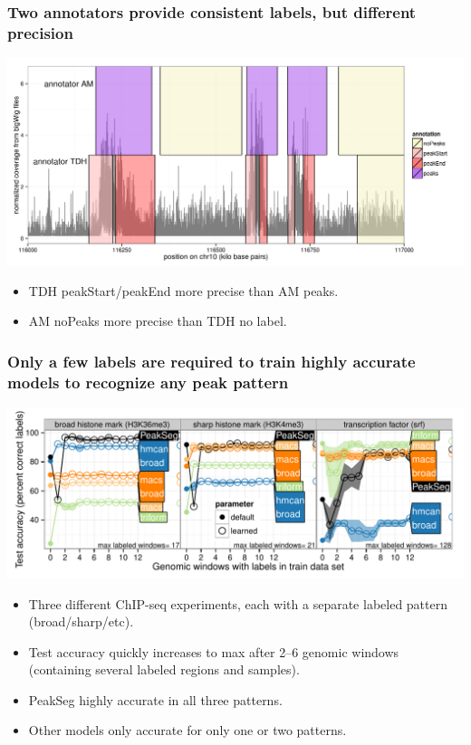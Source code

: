 \documentclass{beamer}
\begin{document}
\begin{frame}
  \frametitle{Two annotators provide consistent labels, but different
    precision}
  \includegraphics[width=1.1\textwidth]{screenshot-several-annotators}

  \begin{itemize}
  \item TDH peakStart/peakEnd more precise than AM peaks.
  \item AM noPeaks more precise than TDH no label.
  \end{itemize}
\end{frame}

\begin{frame}
  \frametitle{Only a few labels are required to train highly accurate models to recognize any peak pattern}
  \includegraphics[width=1.1\textwidth]{figure-test-error-decreases-mean.pdf}
 
  \begin{itemize}
  \item Three different ChIP-seq experiments, each with a separate
    labeled pattern (broad/sharp/etc).
  \item Test accuracy quickly increases to max after 2--6
    genomic windows (containing several labeled regions and samples).
  \item PeakSeg highly accurate in all three patterns.
  \item Other models only accurate for only one or two patterns.
  \end{itemize}
\end{frame}
\end{document}
